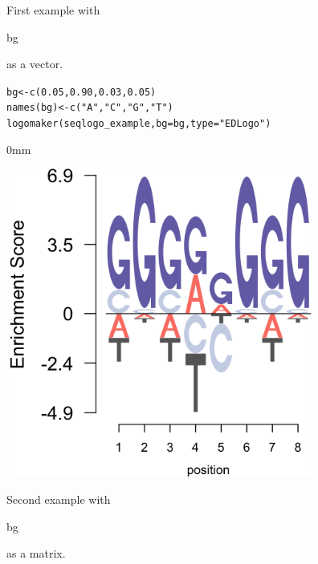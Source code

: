 \documentclass[12pt]{article}\usepackage[]{graphicx}\usepackage[usenames,dvipsnames]{color}
\newcommand{\hlnum}[1]{\textcolor[rgb]{0.816,0.125,0.439}{#1}}%
\newcommand{\hlstr}[1]{\textcolor[rgb]{0.251,0.627,0.251}{#1}}%
\newcommand{\hlstd}[1]{\textcolor[rgb]{0.251,0.251,0.251}{#1}}%
\newcommand{\hlkwb}[1]{\textcolor[rgb]{0,0,0}{#1}}%
\newcommand{\hlkwc}[1]{\textcolor[rgb]{0.251,0.251,0.251}{#1}}%
\newcommand{\hlkwd}[1]{\textcolor[rgb]{0.878,0.439,0.125}{#1}}%
\newenvironment{knitrout}{}{} %
\begin{document}
First example with \begin{verb} bg \end{verb} as a vector.

\begin{knitrout}
\color{fgcolor}\begin{kframe}
\begin{alltt}
\hlstd{bg} \hlkwb{<-} \hlkwd{c}\hlstd{(}\hlnum{0.05}\hlstd{,} \hlnum{0.90}\hlstd{,} \hlnum{0.03}\hlstd{,} \hlnum{0.05}\hlstd{)}
\hlkwd{names}\hlstd{(bg)} \hlkwb{<-} \hlkwd{c}\hlstd{(}\hlstr{"A"}\hlstd{,} \hlstr{"C"}\hlstd{,} \hlstr{"G"}\hlstd{,} \hlstr{"T"}\hlstd{)}
\hlkwd{logomaker}\hlstd{(seqlogo_example,} \hlkwc{bg}\hlstd{=bg,} \hlkwc{type} \hlstd{=} \hlstr{"EDLogo"}\hlstd{)}
\end{alltt}
\end{kframe}\begin{adjustwidth}{\fltoffset}{0mm}

\includegraphics[width=4in,height=4in]{figure/bg-1} \hfill{}

\end{adjustwidth}
\end{knitrout}

Second example with \begin{verb} bg \end{verb} as a matrix.
\end{document}
